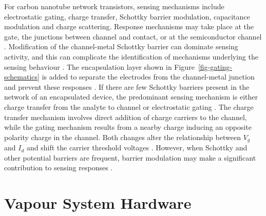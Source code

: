 \documentclass[
  a4paper,
]{scrbook}
\begin{document}
For carbon nanotube network transistors, sensing mechanisms include
electrostatic gating, charge transfer, Schottky barrier modulation,
capacitance modulation and charge scattering. Response mechanisms may
take place at the gate, the junctions between channel and contact, or at
the semiconductor channel
\autocite{Heller2008,Battie2011,Boyd2014,Tran2016,Li2023}. Modification
of the channel-metal Schottky barrier can dominate sensing activity, and
this can complicate the identification of mechanisms underlying the
sensing behaviour \autocite{Cao2009,Boyd2014,Schroeder2019}. The
encapsulation layer shown in Figure~\ref{fig-gating-schematics} is added
to separate the electrodes from the channel-metal junction and prevent
these responses \autocite{Heller2008,Shkodra2021}. If there are few
Schottky barriers present in the network of an encapsulated device, the
predominant sensing mechanism is either charge transfer from the analyte
to channel \autocite{Allen2007,Battie2011} or electrostatic gating
\autocite{Heller2008}. The charge transfer mechanism involves direct
addition of charge carriers to the channel, while the gating mechanism
results from a nearby charge inducing an opposite polarity charge in the
channel. Both changes alter the relationship between \(V_g\) and \(I_d\)
and shift the carrier threshold voltages
\autocite{Tran2016,Shkodra2021}. However, when Schottky and other
potential barriers are frequent, barrier modulation may make a
significant contribution to sensing responses
\autocite{Boyd2014,Murugathas2019a}.

\cleardoublepage
{}
{}
\appendix

\hypertarget{sec-vapour-sensor-components}{%
\chapter{Vapour System Hardware}\label{sec-vapour-sensor-components}}
\end{document}
